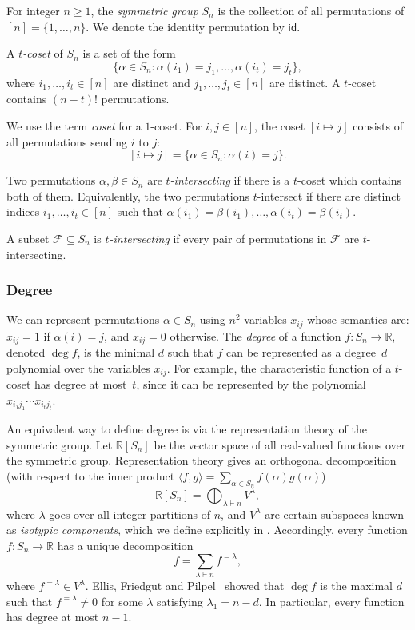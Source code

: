 \documentclass[10pt,a4paper]{amsart}
\theoremstyle{definition}
\providecommand{\coset}[2]{[#1 \mapsto #2]}
\providecommand{\id}{\mathsf{id}}
\begin{document}
For integer $n \geq 1$, the \emph{symmetric group} $S_n$ is the collection of all permutations of $[n] = \{1,\ldots,n\}$. We denote the identity permutation by $\id$.

A \emph{$t$-coset} of $S_n$ is a set of the form
\[
 \{ \alpha \in S_n : \alpha(i_1) = j_1, \ldots, \alpha(i_t) = j_t \},
\]
where $i_1,\ldots,i_t \in [n]$ are distinct and $j_1,\ldots,j_t \in [n]$ are distinct. A $t$-coset contains $(n-t)!$ permutations.

We use the term \emph{coset} for a $1$-coset. For $i,j \in [n]$, the coset $\coset{i}{j}$ consists of all permutations sending $i$ to $j$:
\[
 \coset{i}{j} = \{ \alpha \in S_n : \alpha(i) = j \}.
\]

Two permutations $\alpha,\beta \in S_n$ are \emph{$t$-intersecting} if there is a $t$-coset which contains both of them. Equivalently, the two permutations $t$-intersect if there are distinct indices $i_1,\ldots,i_t \in [n]$ such that $\alpha(i_1) = \beta(i_1),\ldots,\alpha(i_t) = \beta(i_t)$.

A subset $\mathcal{F} \subseteq S_n$ is \emph{$t$-intersecting} if every pair of permutations in $\mathcal{F}$ are $t$-intersecting.

\subsubsection{Degree} \label{sec:degree-sym}

We can represent permutations $\alpha \in S_n$ using $n^2$ variables $x_{ij}$ whose semantics are: $x_{ij} = 1$ if $\alpha(i) = j$, and $x_{ij} = 0$ otherwise. The \emph{degree} of a function $f\colon S_n \to \mathbb{R}$, denoted $\deg f$, is the minimal $d$ such that $f$ can be represented as a degree~$d$ polynomial over the variables $x_{ij}$.
For example, the characteristic function of a $t$-coset has degree at most~$t$, since it can be represented by the polynomial $x_{i_1j_1} \cdots x_{i_tj_t}$.

An equivalent way to define degree is via the representation theory of the symmetric group. Let $\mathbb{R}[S_n]$ be the vector space of all real-valued functions over the symmetric group. Representation theory gives an orthogonal decomposition (with respect to the inner product $\langle f,g \rangle = \sum_{\alpha \in S_n} f(\alpha) g(\alpha)$)
\[
 \mathbb{R}[S_n] = \bigoplus_{\lambda \vdash n} V^\lambda,
\]
where $\lambda$ goes over all integer partitions of $n$, and $V^\lambda$ are certain subspaces known as \emph{isotypic components}, which we define explicitly in . Accordingly, every function $f\colon S_n \to \mathbb{R}$ has a unique decomposition
\[
 f = \sum_{\lambda \vdash n} f^{=\lambda},
\]
where $f^{=\lambda} \in V^\lambda$. 
Ellis, Friedgut and Pilpel~\cite[Theorem 7]{EFP} showed that $\deg f$ is the maximal $d$ such that $f^{=\lambda} \neq 0$ for some $\lambda$ satisfying $\lambda_1 = n - d$. In particular, every function has degree at most $n-1$.
\end{document}
